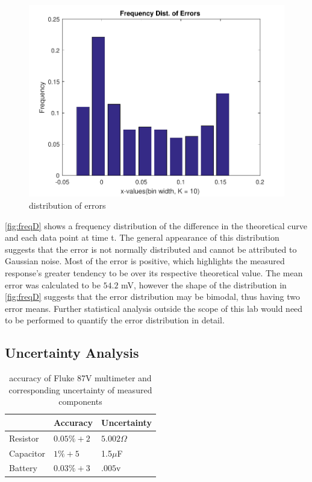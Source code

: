 \documentclass[10pt,twocolumn]{article}
\begin{document}
\begin{figure}[hbt]
	\centering
	\includegraphics[width=.9\linewidth]{figures/freqDist.pdf}
	\caption{distribution of errors}
	\label{fig:freqD}
\end{figure}

\autoref{fig:freqD} shows a frequency distribution of the difference in the theoretical curve and each data point at time t. The general appearance of this distribution suggests that the error is not normally distributed and cannot be attributed to Gaussian noise.  Most of the error is positive, which highlights the measured response's greater tendency to be over its respective theoretical value. The mean error was calculated to be $54.2$ mV, however the shape of the distribution in \autoref{fig:freqD} suggests that the error distribution may be bimodal, thus having two error means. Further statistical analysis outside the scope of this lab would need to be performed to quantify the error distribution in detail.

\subsection{Uncertainty Analysis}

\begin{table}[h]
	\begin{tabularx}{1\linewidth}{ lXX }
		\hline
		 & \textbf{Accuracy} & \textbf{Uncertainty} \\
		\hline
		Resistor & $0.05\% + 2$ & $5.002\Omega$ \\
		Capacitor & $1\% +5$ & 1.5$\mu$F \\
		Battery & $0.03\%+3$ & $.005$v \\
		\hline
	\end{tabularx}
	\caption{accuracy of Fluke 87V multimeter and corresponding uncertainty of measured components}
	\label{tab:uncert}
\end{table}
\end{document}
